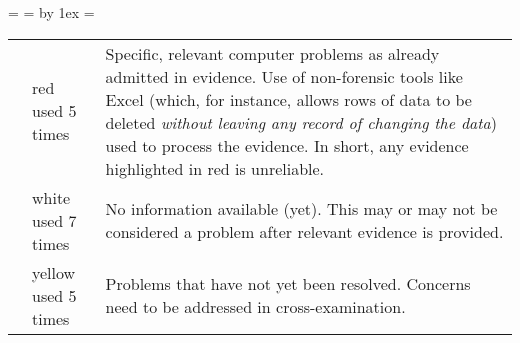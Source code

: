 =\hbox{}%
 =  \advance {} by 1ex  = 
\begin{tabular}{@{}clp{3.75in}}
\vphantom{\copy0}{red}&red used 5 times&Specific, relevant computer problems as already admitted in evidence. Use of non-forensic tools like Excel (which, for instance, allows rows of data to be deleted \emph{without leaving any record of changing the data\/}) used to process the evidence. In short, any evidence highlighted in red is unreliable.\\ 
{white}&white used 7 times&No information available (yet). This may or may not be considered a problem after relevant evidence is provided.\\ 
{yellow}&yellow used 5 times&Problems that have not yet been resolved. Concerns need to be addressed in cross-examination.\\ 
 \end{tabular}

